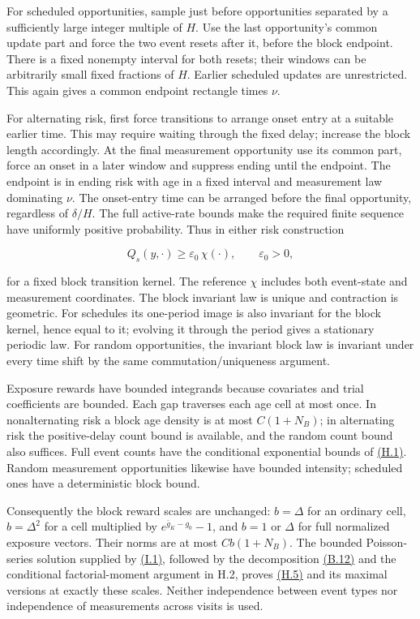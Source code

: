 \documentclass[11pt]{article}
\begin{document}
For scheduled opportunities, sample just before opportunities separated by a sufficiently large integer multiple of \(H\). Use the last opportunity's common update part and force the two event resets after it, before the block endpoint. There is a fixed nonempty interval for both resets; their windows can be arbitrarily small fixed fractions of \(H\). Earlier scheduled updates are unrestricted. This again gives a common endpoint rectangle times \(\nu\).

For alternating risk, first force transitions to arrange onset entry at a suitable earlier time. This may require waiting through the fixed delay; increase the block length accordingly. At the final measurement opportunity use its common part, force an onset in a later window and suppress ending until the endpoint. The endpoint is in ending risk with age in a fixed interval and measurement law dominating \(\nu\). The onset-entry time can be arranged before the final opportunity, regardless of \(\delta/H\). The full active-rate bounds make the required finite sequence have uniformly positive probability. Thus in either risk construction

\begin{equation*}
Q_s(y,\cdot)\geq\varepsilon_0\,\chi(\cdot),\qquad \varepsilon_0>0,
\tag{I.1}\label{eq:I.1}
\end{equation*}

for a fixed block transition kernel. The reference \(\chi\) includes both event-state and measurement coordinates. The block invariant law is unique and contraction is geometric. For schedules its one-period image is also invariant for the block kernel, hence equal to it; evolving it through the period gives a stationary periodic law. For random opportunities, the invariant block law is invariant under every time shift by the same commutation/uniqueness argument.

Exposure rewards have bounded integrands because covariates and trial coefficients are bounded. Each gap traverses each age cell at most once. In nonalternating risk a block age density is at most \(C(1+N_B)\); in alternating risk the positive-delay count bound is available, and the random count bound also suffices. Full event counts have the conditional exponential bounds of \hyperref[eq:H.1]{(H.1)}. Random measurement opportunities likewise have bounded intensity; scheduled ones have a deterministic block bound.

Consequently the block reward scales are unchanged: \(b=\Delta\) for an ordinary cell, \(b=\Delta^2\) for a cell multiplied by \(e^{\bar g_K-g_0}-1\), and \(b=1\) or \(\Delta\) for full normalized exposure vectors. Their norms are at most \(Cb(1+N_B)\). The bounded Poisson-series solution supplied by \hyperref[eq:I.1]{(I.1)}, followed by the decomposition \hyperref[eq:B.12]{(B.12)} and the conditional factorial-moment argument in H.2, proves \hyperref[eq:H.5]{(H.5)} and its maximal versions at exactly these scales. Neither independence between event types nor independence of measurements across visits is used.
\end{document}
